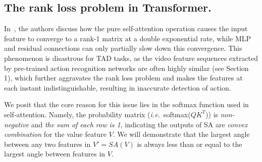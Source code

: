 \documentclass[10pt,twocolumn,letterpaper]{article}
\def\ie{{\em i.e.}}
\begin{document}
\begin{figure}[t!]
\end{figure}

\begin{table}[t]
\end{table}

\subsection{The rank loss problem in Transformer.}
In~\cite{dong2021attention}, the authors discuss how the pure self-attention operation causes the input feature to converge to a rank-1 matrix at a double exponential rate, while MLP and residual connections can only partially slow down this convergence. This phenomenon is disastrous for TAD tasks, as the video feature sequences extracted by pre-trained action recognition networks are often highly similar (see Section 1), which further aggravates the rank loss problem and makes the features at each instant indistinguishable, resulting in inaccurate detection of action.

We posit that the core reason for this issue lies in the softmax function used in self-attention. Namely, the probability matrix (\ie~softmax($QK^T$)) is \emph{non-negative} and \emph{the sum of each row is 1}, indicating the outputs of SA are \emph{convex combination} for the value feature $V$. We will demonstrate that the largest angle between any two features in $V' = SA(V)$ is always less than or equal to the largest angle between features in $V$.
\end{document}
